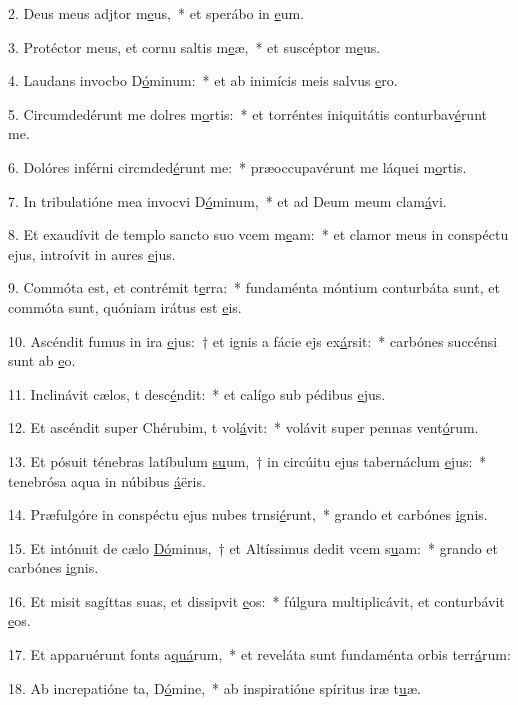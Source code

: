 2. Deus meus adjtor m\uline{e}us,~* et sperábo in \uline{e}um.\par 
3. Protéctor meus, et cornu saltis m\uline{e}æ,~* et suscéptor m\uline{e}us.\par 
4. Laudans invocbo D\uline{ó}minum:~* et ab inimícis meis salvus \uline{e}ro.\par 
5. Circumdedérunt me dolres m\uline{o}rtis:~* et torréntes iniquitátis conturbav\uline{é}runt me.\par 
6. Dolóres inférni circmded\uline{é}runt me:~* præoccupavérunt me láquei m\uline{o}rtis.\par 
7. In tribulatióne mea invocvi D\uline{ó}minum,~* et ad Deum meum clam\uline{á}vi.\par 
8. Et exaudívit de templo sancto suo vcem m\uline{e}am:~* et clamor meus in conspéctu ejus, introívit in aures \uline{e}jus.\par 
9. Commóta est, et contrémit t\uline{e}rra:~* fundaménta móntium conturbáta sunt, et commóta sunt, quóniam irátus est \uline{e}is.\par 
10. Ascéndit fumus in ira \uline{e}jus:~† et ignis a fácie ejs ex\uline{á}rsit:~* carbónes succénsi sunt ab \uline{e}o.\par 
11. Inclinávit cælos, t desc\uline{é}ndit:~* et calígo sub pédibus \uline{e}jus.\par 
12. Et ascéndit super Chérubim, t vol\uline{á}vit:~* volávit super pennas vent\uline{ó}rum.\par 
13. Et pósuit ténebras latíbulum \uline{su}um,~† in circúitu ejus tabernáclum \uline{e}jus:~* tenebrósa aqua in núbibus \uline{á}ëris.\par 
14. Præfulgóre in conspéctu ejus nubes trnsi\uline{é}runt,~* grando et carbónes \uline{i}gnis.\par 
15. Et intónuit de cælo \uline{Dó}minus,~† et Altíssimus dedit vcem s\uline{u}am:~* grando et carbónes \uline{i}gnis.\par 
16. Et misit sagíttas suas, et dissipvit \uline{e}os:~* fúlgura multiplicávit, et conturbávit \uline{e}os.\par 
17. Et apparuérunt fonts a\uline{quá}rum,~* et reveláta sunt fundaménta orbis terr\uline{á}rum:\par 
18. Ab increpatióne ta, D\uline{ó}mine,~* ab inspiratióne spíritus iræ t\uline{u}æ.\par 
